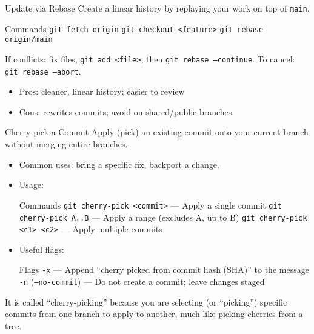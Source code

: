 \documentclass{beamer}
\begin{document}
\begin{frame}{Update via Rebase}
  \footnotesize
  Create a linear history by replaying your work on top of \texttt{main}.
  \begin{block}{Commands}
    \texttt{git fetch origin}\newline
    \texttt{git checkout <feature>}\newline
    \texttt{git rebase origin/main}
  \end{block}
  If conflicts: fix files, \texttt{git add <file>}, then \texttt{git rebase --continue}. To cancel: \texttt{git rebase --abort}.
  \begin{itemize}
    \item Pros: cleaner, linear history; easier to review
    \item Cons: rewrites commits; avoid on shared/public branches
  \end{itemize}
\end{frame}

\begin{frame}{Cherry-pick a Commit}
  \footnotesize
  Apply (pick) an existing commit onto your current branch without merging entire branches.
  \begin{itemize}
    \item Common uses: bring a specific fix, backport a change.
    \item Usage:
    \begin{block}{Commands}
      \texttt{git cherry-pick <commit>} --- Apply a single commit\newline
      \texttt{git cherry-pick A..B} --- Apply a range (excludes A, up to B)\newline
      \texttt{git cherry-pick <c1> <c2>} --- Apply multiple commits
    \end{block}
    \item Useful flags:
    \begin{block}{Flags}
      \texttt{-x} --- Append ``cherry picked from commit hash (SHA)'' to the message\newline
      \texttt{-n} (\texttt{--no-commit}) --- Do not create a commit; leave changes staged
    \end{block}
  \end{itemize}
  It is called ``cherry-picking'' because you are selecting (or ``picking'') specific commits from one branch to apply to another, much like picking cherries from a tree.
\end{frame}
\end{document}
